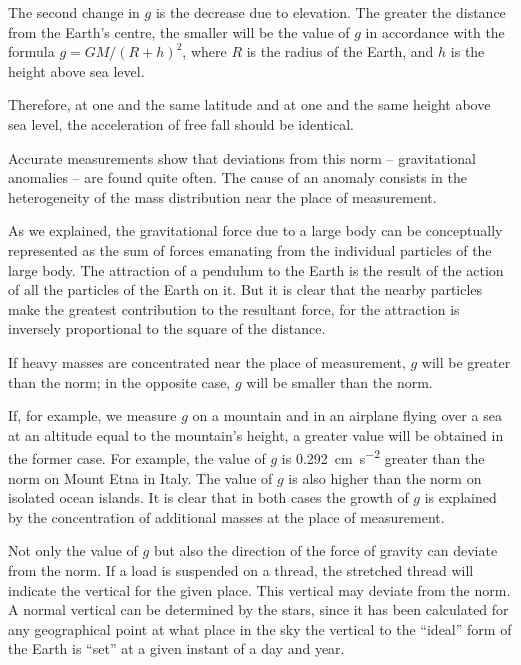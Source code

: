 The second change in $g$ is the decrease due to elevation.
The greater the distance from the Earth's centre, the
smaller will be the value of $g$ in accordance with the
formula $g = GM/(R + h)^{2}$, where $R$ is the radius of the
Earth, and $h$ is the height above sea level.

Therefore, at one and the same latitude and at one and
the same height above sea level, the acceleration of free
fall should be identical.

Accurate measurements show that deviations from
this norm -- gravitational anomalies -- are found quite often. The cause of an anomaly consists in the heterogeneity of the mass distribution near the place of measurement.

As we explained, the gravitational force due to a large
body can be conceptually represented as the sum of forces
emanating from the individual particles of the large body.
The attraction of a pendulum to the Earth is the result
of the action of all the particles of the Earth on it. But
it is clear that the nearby particles make the greatest
contribution to the resultant force, for the attraction
is inversely proportional to the square of the distance.

If heavy masses are concentrated near the place of
measurement, $g$ will be greater than the norm; in the
opposite case, $g$ will be smaller than the norm.

If, for example, we measure $g$ on a mountain and in an
airplane flying over a sea at an altitude equal to the
mountain's height, a greater value will be obtained in
the former case. For example, the value of $g$ is \SI{0.292}{\centi\meter\per\second\squared}
greater than the norm on Mount Etna in Italy. The value
of $g$ is also higher than the norm on isolated ocean islands.
It is clear that in both cases the growth of $g$ is explained
by the concentration of additional masses at the place
of measurement.

Not only the value of $g$ but also the direction of the
force of gravity can deviate from the norm. If a load
is suspended on a thread, the stretched thread will indicate the vertical for the given place. This vertical may
deviate from the norm. A normal vertical can be determined by the stars, since it has been calculated for any
geographical point at what place in the sky the vertical
to the ``ideal'' form of the Earth is ``set'' at a given instant
of a day and year.

